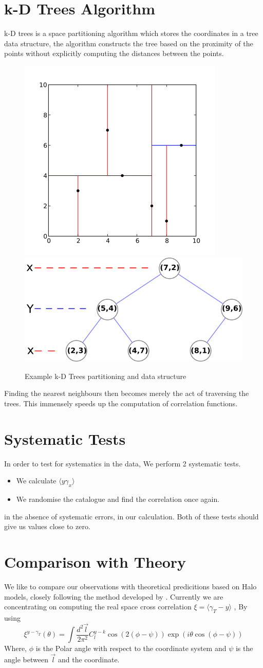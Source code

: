 \section{k-D Trees Algorithm}
k-D trees is a space partitioning algorithm which stores the coordinates in a tree data structure,
the algorithm constructs the tree based on the proximity of the points without explicitly computing the distances between
the points.
\begin{figure}[htbp]
  \centering
  \includegraphics[width=0.3\linewidth]{kdtree_2d.png}
  \includegraphics[width=0.3\linewidth]{tree_2d.png}
  \caption{Example k-D Trees partitioning and data structure}
\end{figure}
Finding the nearest neighbours then becomes merely the act of traversing the trees. This immensely speeds
up the computation of correlation functions.

\section{Systematic Tests}
In order to test for systematics in the data, We perform 2 systematic tests.
\begin{itemize}
\item We calculate $\langle y \gamma_x \rangle$
\item We randomise the catalogue and find the correlation once again.
\end{itemize}
in the absence of systematic errors, in our calculation. Both of these tests should give us values close to zero.



\section{Comparison with Theory}
\label{theory}
We like to compare our observations with theoretical predicitions based on Halo models, closely
following the method developed by 
\cite{halotheoryma}. Currently we are concentrating on computing the real space cross correlation
$ \xi = \langle \gamma_T - y \rangle$ , By using
\begin{equation}
  \label{realcrosstheory}
  \xi^{y - \gamma_T} (\theta) = \int \frac{d^2 \vec{l}}{2\pi^2 } C_l^{y-k} \cos(2(\phi - \psi)) \exp(i \theta \cos(\phi - \psi))
\end{equation}
Where, $\phi$ is the Polar angle with respect to the coordinate system and $\psi$ is the angle
between $\vec{l}$ and the coordinate.

